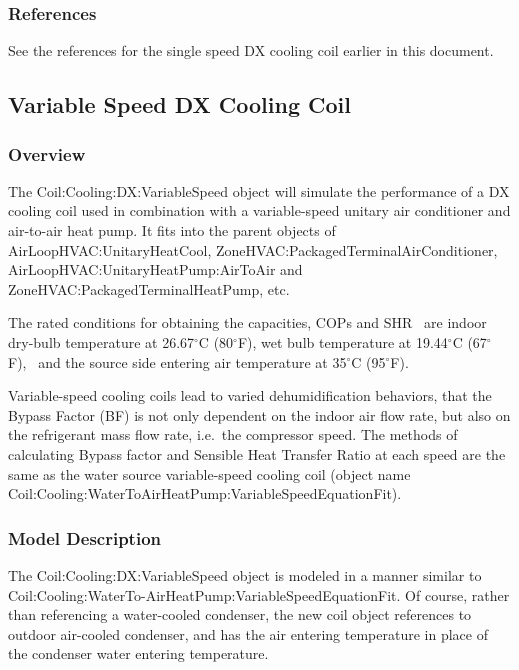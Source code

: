 \subsubsection{References}\label{references-4-001}

See the references for the single speed DX cooling coil earlier in this document.

\subsection{Variable Speed DX Cooling Coil}\label{variable-speed-dx-cooling-coil}

\subsubsection{Overview}\label{overview-4-002}

The Coil:Cooling:DX:VariableSpeed object will simulate the performance of a DX cooling coil used in combination with a variable-speed unitary air conditioner and air-to-air heat pump. It fits into the parent objects of AirLoopHVAC:UnitaryHeatCool, ZoneHVAC:PackagedTerminalAirConditioner, AirLoopHVAC:UnitaryHeatPump:AirToAir and ZoneHVAC:PackagedTerminalHeatPump, etc.

The rated conditions for obtaining the capacities, COPs and SHR~ are indoor dry-bulb temperature at 26.67\(^{\circ}\)C (80\(^{\circ}\)F), wet bulb temperature at 19.44\(^{\circ}\)C (67\(^{\circ}\)F),~ and the source side entering air temperature at 35\(^{\circ}\)C (95\(^{\circ}\)F).

Variable-speed cooling coils lead to varied dehumidification behaviors, that the Bypass Factor (BF) is not only dependent on the indoor air flow rate, but also on the refrigerant mass flow rate, i.e.~the compressor speed. The methods of calculating Bypass factor and Sensible Heat Transfer Ratio at each speed are the same as the water source variable-speed cooling coil (object name Coil:Cooling:WaterToAirHeatPump:VariableSpeedEquationFit).

\subsubsection{Model Description}\label{model-description-3-003}

The Coil:Cooling:DX:VariableSpeed object is modeled in a manner similar to Coil:Cooling:WaterTo-AirHeatPump:VariableSpeedEquationFit. Of course, rather than referencing a water-cooled condenser, the new coil object references to outdoor air-cooled condenser, and has the air entering temperature in place of the condenser water entering temperature.

